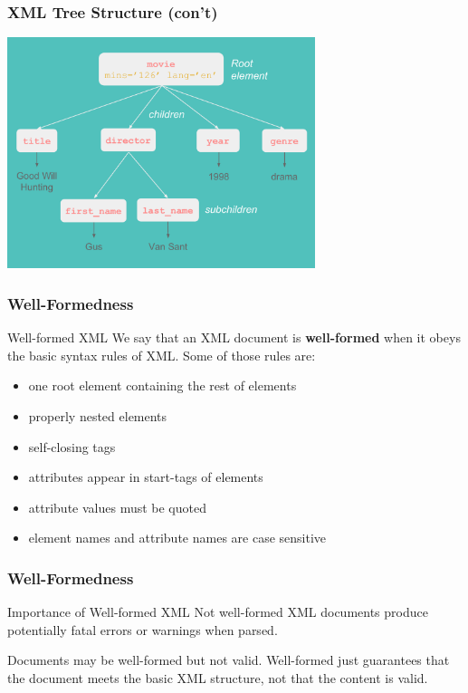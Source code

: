 \documentclass{beamer}\usepackage[]{graphicx}\usepackage[]{color}
\begin{document}
\begin{frame}
\frametitle{XML Tree Structure (con't)}

\begin{center}
\includegraphics[width=9cm]{images/xml_movie_tree2.pdf}
\end{center}

\end{frame}


\begin{frame}
\frametitle{Well-Formedness}

\begin{block}{Well-formed XML}
We say that an XML document is \textbf{well-formed} when it obeys the basic syntax rules of XML. Some of those rules are:
\begin{itemize}
 \item one root element containing the rest of elements
 \item properly nested elements
 \item self-closing tags
 \item attributes appear in start-tags of elements
 \item attribute values must be quoted
 \item element names and attribute names are case sensitive
\end{itemize}
\end{block}

\end{frame}


\begin{frame}
\frametitle{Well-Formedness}

\begin{block}{Importance of Well-formed XML}
Not well-formed XML documents produce potentially fatal errors or warnings when parsed.

\bigskip
Documents may be well-formed but not valid. Well-formed just guarantees that the document meets the basic XML structure, not that the content is valid.
\end{block}

\end{frame}
\end{document}
